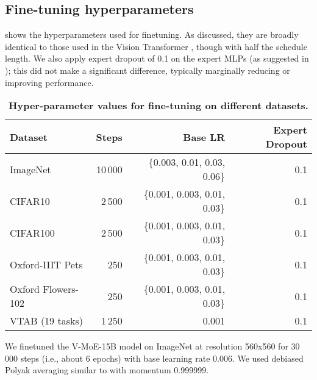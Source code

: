 \documentclass{article}
\newcommand{\abbv}{{V-MoE}}
\begin{document}
\subsection{Fine-tuning hyperparameters}\label{sec:finetune_hparams}
 shows the hyperparameters used for finetuning. As discussed, they are broadly identical to those used in the Vision Transformer \cite{dosovitskiy2020image}, though with half the schedule length. We also apply expert dropout of 0.1 on the expert MLPs (as suggested in \cite{fedus2021switch}); this did not make a significant difference, typically marginally reducing or improving performance.
\begin{table}[tb]
\centering
\caption{
\label{tab:finetune_hparams} \textbf{Hyper-parameter values for fine-tuning on different datasets.}}
\begin{tabular}{lrrr}
\toprule
Dataset  & Steps & Base LR & Expert Dropout \\
\midrule
ImageNet & 10\,000 & \{0.003, 0.01, 0.03, 0.06\} & 0.1\\
CIFAR10  & 2\,500  & \{0.001, 0.003, 0.01, 0.03\} & 0.1\\
CIFAR100 & 2\,500  & \{0.001, 0.003, 0.01, 0.03\} & 0.1\\
Oxford-IIIT Pets & 250 & \{0.001, 0.003, 0.01, 0.03\} & 0.1\\
Oxford Flowers-102 & 250 & \{0.001, 0.003, 0.01, 0.03\} & 0.1\\
VTAB (19 tasks) & 1\,250 & 0.001 & 0.1\\
\bottomrule     
\end{tabular}
\end{table}

We finetuned the \abbv{}-15B model on ImageNet at resolution 560x560 for 30\,000 steps (i.e., about 6 epochs) with base learning rate 0.006. We used debiased Polyak averaging similar to \cite{dosovitskiy2020image} with momentum 0.999999.
\end{document}
